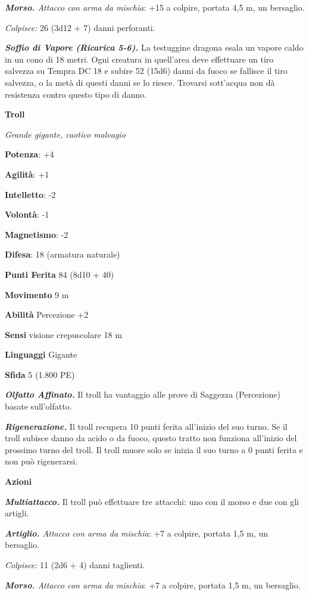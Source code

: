 \begin{multicols}{2}
\emph{\textbf{Morso.} Attacco con arma da mischia}: +15 a colpire,
portata 4,5 m, un bersaglio.

\emph{Colpisce:} 26 (3d12 + 7) danni perforanti.

\emph{\textbf{Soffio di Vapore (Ricarica 5-6).}} La testuggine dragona
esala un vapore caldo in un cono di 18 metri. Ogni creatura in
quell'area deve effettuare un tiro salvezza su Tempra DC 18 e
subire 52 (15d6) danni da fuoco se fallisce il tiro salvezza, o la metà
di questi danni se lo riesce. Trovarsi sott'acqua non dà resistenza
contro questo tipo di danno.

\textbf{Troll}

\emph{Grande gigante, caotico malvagio}

\textbf{Potenza}: +4

\textbf{Agilità}: +1

\textbf{Intelletto}: -2

\textbf{Volontà}: -1

\textbf{Magnetismo}: -2

\textbf{Difesa}: 18 (armatura naturale)

\textbf{Punti Ferita} 84 (8d10 + 40)

\textbf{Movimento} 9 m

\textbf{Abilità} Percezione +2

\textbf{Sensi} visione crepuscolare 18 m

\textbf{Linguaggi} Gigante

\textbf{Sfida} 5 (1.800 PE)

\emph{\textbf{Olfatto Affinato.}} Il troll ha vantaggio alle prove di
Saggezza (Percezione) basate sull'olfatto.

\emph{\textbf{Rigenerazione.}} Il troll recupera 10 punti ferita
all'inizio del suo turno. Se il troll subisce danno da acido o da fuoco,
questo tratto non funziona all'inizio del prossimo turno del troll. Il
troll muore solo se inizia il suo turno a 0 punti ferita e non può
rigenerarsi.

\textbf{Azioni}

\emph{\textbf{Multiattacco.}} Il troll può effettuare tre attacchi: uno
con il morso e due con gli artigli.

\emph{\textbf{Artiglio.} Attacco con arma da mischia}: +7 a colpire,
portata 1,5 m, un bersaglio.

\emph{Colpisce:} 11 (2d6 + 4) danni taglienti.

\emph{\textbf{Morso.} Attacco con arma da mischia}: +7 a colpire,
portata 1,5 m, un bersaglio.


\end{multicols}
